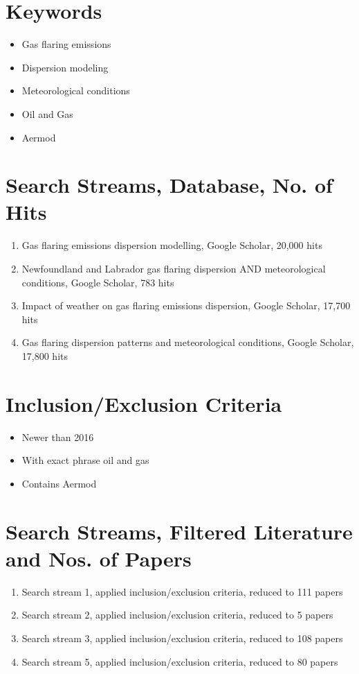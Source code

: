 \section*{Keywords}
\begin{itemize}
    \item Gas flaring emissions
    \item Dispersion modeling
    \item Meteorological conditions
    \item Oil and Gas
    \item Aermod
\end{itemize}

\section*{Search Streams, Database, No. of Hits}
\begin{enumerate}
    \item Gas flaring emissions dispersion modelling, Google Scholar, 20,000 hits
    \item Newfoundland and Labrador gas flaring dispersion AND meteorological conditions, Google Scholar, 783 hits
    \item Impact of weather on gas flaring emissions dispersion, Google Scholar, 17,700 hits
    \item Gas flaring dispersion patterns and meteorological conditions, Google Scholar, 17,800 hits
\end{enumerate}
\section*{Inclusion/Exclusion Criteria}
\begin{itemize}
    \item Newer than 2016
    \item With exact phrase oil and gas
    \item Contains Aermod
\end{itemize}

\section*{Search Streams, Filtered Literature and Nos. of Papers}
\begin{enumerate}
    \item Search stream 1, applied inclusion/exclusion criteria, reduced to 111 papers
    \item Search stream 2, applied inclusion/exclusion criteria, reduced to 5 papers
    \item Search stream 3, applied inclusion/exclusion criteria, reduced to 108 papers 
    \item Search stream 5, applied inclusion/exclusion criteria, reduced to 80 papers
\end{enumerate}

